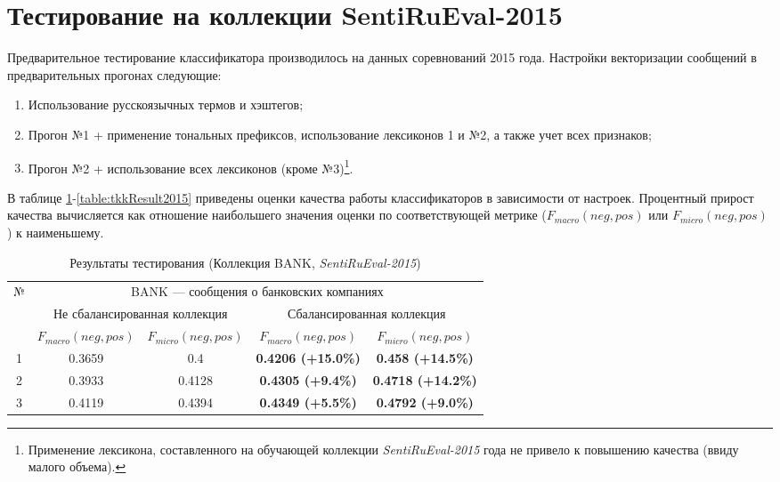 \section{Тестирование на коллекции SentiRuEval-2015}
\label{sec:test2015}
Предварительное тестирование классификатора производилось на данных
соревнований 2015 года.
Настройки векторизации сообщений в предварительных прогонах следующие:
\begin{enumerate}
    \item Использование русскоязычных термов и хэштегов;
    \item Прогон №1 + применение тональных префиксов, использование лексиконов 1
        и №2, а также учет всех признаков;
    \item Прогон №2 + использование всех лексиконов (кроме №3)\footnote{
        Применение лексикона, составленного на обучающей коллекции {\it SentiRuEval-2015}
        года не привело к повышению качества (ввиду малого объема).
    }.
\end{enumerate}

В таблице \ref{table:bankResult2015}-\ref{table:tkkResult2015} приведены оценки
качества работы классификаторов в зависимости от настроек.
Процентный прирост качества вычисляется как отношение наибольшего значения оценки по
соответствующей метрике ($F_{macro}(neg, pos)$ или $F_{micro}(neg, pos)$) к
наименьшему.

\begin{table}[ht!]
\centering
\caption{Результаты тестирования (Коллекция BANK, {\it SentiRuEval-2015})}
\label{table:bankResult2015}
\begin{tabular}{|c|c|c|c|c|}
\hline
\multirow{3}{*}{№} & \multicolumn{4}{c|}{BANK --- сообщения о банковских компаниях}                                                               \\ \cline{2-5}
                   & \multicolumn{2}{c|}{Не сбалансированная коллекция} & \multicolumn{2}{c|}{Сбалансированная коллекция} \\ \cline{2-5}
                   & $F_{macro}(neg, pos)$    & $F_{micro}(neg, pos)$   & $F_{macro}(neg, pos)$  & $F_{micro}(neg, pos)$  \\ \hline
1                  & 0.3659                   & 0.4                     & {\bf 0.4206 (+15.0\%)}       & {\bf 0.458 (+14.5\%) }       \\ \hline
2                  & 0.3933                   & 0.4128                  & {\bf 0.4305 (+9.4\%) }       & {\bf 0.4718 (+14.2\%)}       \\ \hline
3                  & 0.4119                   & 0.4394                  & {\bf 0.4349 (+5.5\%) }       & {\bf 0.4792 (+9.0\%) }       \\ \hline
\end{tabular}
\end{table}

